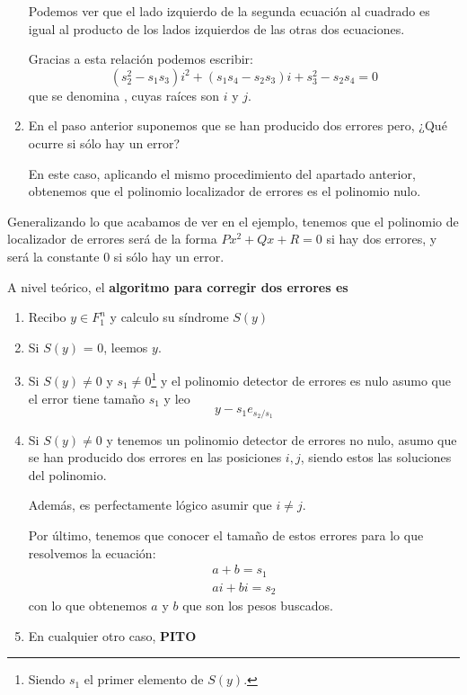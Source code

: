 \begin{example}
\begin{enumerate}
Podemos ver que el lado izquierdo de la segunda ecuación al cuadrado es igual al producto de los lados izquierdos de las otras dos ecuaciones.

Gracias a esta relación podemos escribir:
\[(s_2^2-s_1s_3)i^2+(s_1s_4-s_2s_3)i+s_3^2-s_2s_4=0\]
que se denomina , cuyas raíces son $i$ y $j$.

\item En el paso anterior suponemos que se han producido dos errores pero, ¿Qué ocurre si sólo hay un error?

En este caso, aplicando el mismo procedimiento del apartado anterior, obtenemos que el polinomio localizador de errores es el polinomio nulo.

\end{enumerate}
\end{example}

Generalizando lo que acabamos de ver en el ejemplo, tenemos que el polinomio de localizador de errores será de la forma $Px^2+Qx+R=0$ si hay dos errores, y será la constante $0$ si sólo hay un error.

A nivel teórico, el \textbf{algoritmo para corregir dos errores es}
\begin{enumerate}
\item Recibo $y\in F_1^n$ y calculo su síndrome $S(y)$
\item Si $S(y)$ = 0, leemos $y$.
\item Si $S(y) \neq 0$ y $s_1\neq 0$\footnote{Siendo $s_1$ el primer elemento de $S(y)$.} y el polinomio detector de errores es nulo asumo que el error tiene tamaño $s_1$ y leo
\[y-s_1e_{s_2/s_1}\]

\item Si $S(y) \neq 0$ y tenemos un polinomio detector de errores no nulo, asumo que se han producido dos errores en las posiciones $i,j$, siendo estos las soluciones del polinomio.

Además, es perfectamente lógico asumir que $i\neq j$.

Por último, tenemos que conocer el tamaño de estos errores para lo que resolvemos la ecuación:
\[\begin{array}{l}
a+b=s_1\\
ai+bi=s_2\end{array}\]
con lo que obtenemos $a$ y $b$ que son los pesos buscados.

\item En cualquier otro caso, \textbf{PITO}
\end{enumerate}

